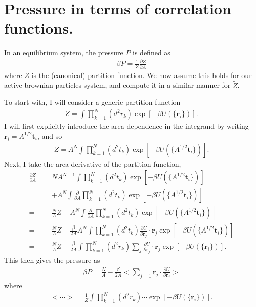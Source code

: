 \documentclass[twocolumn,amsmath,amssymb,aps]{revtex4-1}%
\begin{document}
\section{Pressure in terms of correlation functions.\label{app:pressure}}


In an equilibrium system, the pressure $P$ is defined as
\begin{align}
  \beta P = \frac{1}{Z}\frac{\partial Z}{\partial A}
\end{align}
where $Z$ is the (canonical) partition function. We now
assume this holds for our active brownian particles system,
and compute it in a similar manner for $\tilde{Z}$.

To start with, I will consider a generic partition function
\begin{align}
  Z=\int\prod_{k=1}^N(d^2r_k)\exp[-\beta U(\{\bm{r}_i\})].
\end{align}
I will first explicitly introduce the area dependence in the integrand by
writing $\bm{r}_i = A^{1/2}\bm{t}_i$, and so
\begin{align}
  Z = A^N\int\prod_{k=1}^N(d^2t_k)\exp[-\beta U(\{A^{1/2}\bm{t}_i\})].
\end{align}
Next, I take the area derivative of the partition function,
\begin{align}
  \frac{\partial Z}{\partial A}
  =&NA^{N-1}\int\prod_{k=1}^N(d^2t_k)\exp[-\beta U(\{A^{1/2}\bm{t}_i\})]
  \nonumber\\
  &+A^N\int\frac{\partial}{\partial A}\prod_{k=1}^N(d^2t_k)
  \exp[-\beta U(\{A^{1/2}\bm{t}_i\})]\nonumber\\
  =&\frac{N}{A}Z
  -A^N\int\frac{\partial}{\partial A}\prod_{k=1}^N(d^2t_k)
  \exp[-\beta U(\{A^{1/2}\bm{t}_i\})]\nonumber\\
  =&\frac{N}{A}Z
  -\frac{\beta}{2A}A^N\int\prod_{k=1}^N(d^2t_k)
  \frac{\partial U}{\partial\bm{r}_j}\cdot
  \bm{r}_j\exp[-\beta U(\{A^{1/2}\bm{t}_i\})]\nonumber\\
  =&\frac{N}{A}Z
  -\frac{\beta}{2A}\int\prod_{k=1}^N(d^2r_k)
  \sum_{j}\frac{\partial U}{\partial\bm{r}_j}\cdot
  \bm{r}_j\exp[-\beta U(\{\bm{r}_i\})].
\end{align}
This then gives the pressure as
\begin{align}
  \beta P = \frac{N}{A}
  -\frac{\beta}{2A}\bigg<\sum_{j=1}\bm{r}_j\cdot
  \frac{\partial U}{\partial\bm{r}_j}\bigg>
\end{align}
where
\begin{align}
  <\cdots> = \frac{1}{Z}
  \int\prod_{k=1}^N(d^2r_k)
  \cdots\exp[-\beta U(\{\bm{r}_i\})].
\end{align}
\end{document}
